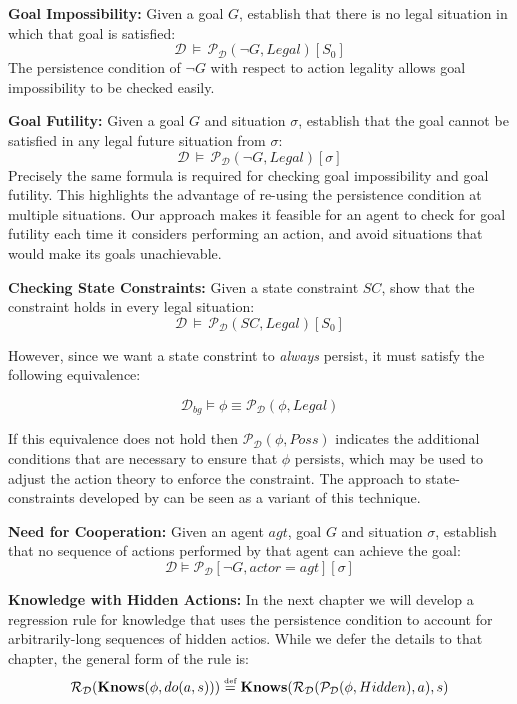 \textbf{Goal Impossibility:} Given a goal $G$, establish that there
is no legal situation in which that goal is satisfied:\[
\mathcal{D\,}\models\,\mathcal{P_{D}}(\neg G,Legal)[S_{0}]\]
 The persistence condition of $\neg G$ with respect to action legality
allows goal impossibility to be checked easily.

\textbf{Goal Futility:} Given a goal $G$ and situation $\sigma$,
establish that the goal cannot be satisfied in any legal future situation
from $\sigma$:\[
\mathcal{D}\,\models\,\mathcal{P_{D}}(\neg G,Legal)[\sigma]\]
 Precisely the same formula is required for checking goal impossibility
and goal futility. This highlights the advantage of re-using the persistence
condition at multiple situations. Our approach makes it feasible for
an agent to check for goal futility each time it considers performing
an action, and avoid situations that would make its goals unachievable.

\textbf{Checking State Constraints:} Given a state constraint $SC$,
show that the constraint holds in every legal situation:\[
\mathcal{D}\,\models\,\mathcal{P_{D}}(SC,Legal)[S_{0}]\]


However, since we want a state constrint to \emph{always} persist,
it must satisfy the following equivalence:

\[
\mathcal{D}_{bg}\models\phi\equiv\mathcal{P}_{\mathcal{D}}(\phi,Legal)\]


If this equivalence does not hold then $\mathcal{P}_{\mathcal{D}}(\phi,Poss)$
indicates the additional conditions that are necessary to ensure that
$\phi$ persists, which may be used to adjust the action theory to
enforce the constraint. The approach to state-constraints developed
by \citet{Lin94-StateConstraints} can be seen as a variant of this
technique.

\textbf{Need for Cooperation:} Given an agent $agt$, goal $G$ and
situation $\sigma$, establish that no sequence of actions performed
by that agent can achieve the goal:\[
\mathcal{D}\models\mathcal{P_{D}}[\neg G,actor=agt][\sigma]\]


\textbf{Knowledge with Hidden Actions:} In the next chapter we will
develop a regression rule for knowledge that uses the persistence
condition to account for arbitrarily-long sequences of hidden actios.
While we defer the details to that chapter, the general form of the
rule is:\[
\mathcal{R}_{\mathcal{D}}(\mathbf{Knows}(\phi,do(a,s)))\stackrel{\mbox{\tiny def}}{=}\mathbf{Knows}(\mathcal{R}_{\mathcal{D}}(\mathcal{P}_{\mathcal{D}}(\phi,Hidden),a),s)\]




